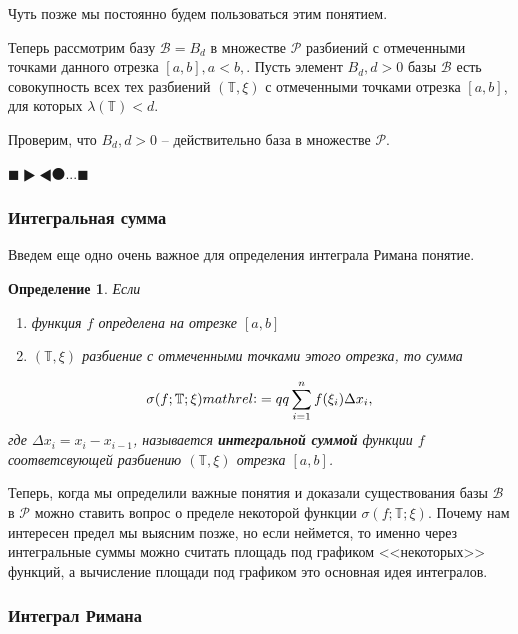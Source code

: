 \documentclass[a4paper,14pt]{article} %
\newtheorem{definition}{Определение}
\begin{document}
	Чуть позже мы постоянно будем пользоваться этим понятием.
	
	\bigskip
	Теперь рассмотрим базу $ \mathscr{B} = {B_d} $ в множестве $ \mathscr{P} $ разбиений с отмеченными точками данного отрезка \( [a, b], a < b,\). Пусть элемент $ B_d, d > 0 $ базы $ \mathscr{B} $ есть совокупность всех тех разбиений \(( \mathbb{T}, \xi )\) с отмеченными точками отрезка \( [a, b] \), для которых $ \lambda(\mathbb{T}) < d $.
	
	\smallskip
	Проверим, что $ {B_d}, d> 0$ -- действительно база в множестве $ \mathcal{P} $.
	
	$\blacksquare \RHD \LHD \medbullet ... \blacksquare $
	
	\subsubsection{Интегральная сумма}
	
	Введем еще одно очень важное для определения интеграла Римана понятие.
	\begin{definition}
    Если
    \begin{enumerate}
        \item {функция \(f\) определена на отрезке \( [a, b] \) }
        \item {\(( \mathbb{T}, \xi )\) разбиение с отмеченными точками этого отрезка, то сумма }
    \end{enumerate}
    \begin{equation}\label{def:integral_sum}
        \sigma(f;\mathbb{T}; \xi) \\mathrel{\mathop:}=qq \sum_{i=1}^{n}{f(\xi_i)\Delta x_i,} 
    \end{equation}
    где $ \Delta x_i = x_i - x_{i-1} $, называется \textbf{интегральной суммой} функции $f$ соответсвующей разбиению \(( \mathbb{T}, \xi )\) отрезка \( [a, b] \).
	\end{definition}
	
	Теперь, когда мы определили важные понятия и доказали существования базы $ \mathscr{B} $ в $\mathscr{P} $ можно ставить вопрос о пределе некоторой функции $ \sigma(f;\mathbb{T}; \xi). $ Почему нам интересен предел мы выясним позже, но если неймется, то именно через интегральные суммы можно считать площадь под графиком <<некоторых>>\footnotemark{} функций, а вычисление площади под графиком это основная идея интегралов. 
	
	\subsubsection{Интеграл Римана}
	
\end{document}
